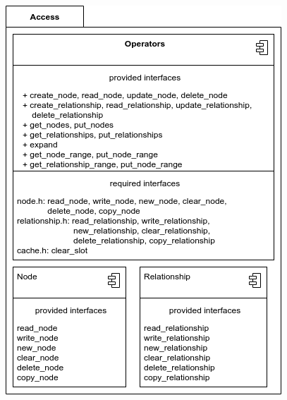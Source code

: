         \begin{center}
         \includegraphics[keepaspectratio, width=\textwidth, height=0.5\textheight]{img/access_arch.png} \\
        \end{center}

            
